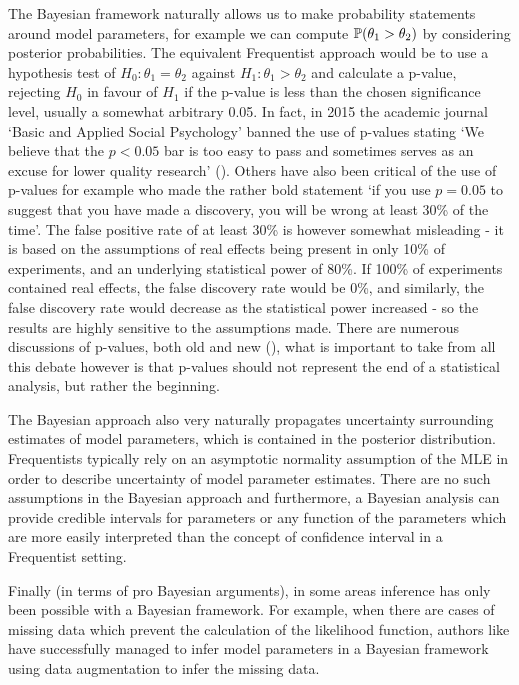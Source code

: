 The Bayesian framework naturally allows us to make probability statements around model parameters, for example we can
compute \(\mathbb{P}(\theta_1 > \theta_2)\) by considering posterior probabilities. The equivalent Frequentist approach would
be to use a hypothesis test of \(H_0: \theta_1 = \theta_2\) against \(H_1: \theta_1 > \theta_2\) and calculate a
p-value, rejecting \(H_0\) in favour of \(H_1\) if the p-value is less than the chosen significance level, usually a
somewhat arbitrary 0.05. In fact, in 2015 the academic journal `Basic and Applied Social Psychology' banned the use of
p-values stating `We believe that the \(p < 0.05\) bar is too easy to pass and sometimes serves as an excuse for lower
quality research' (\cite{pvalueban}). Others have also been critical of the use of p-values for example
\cite{colquhoun2014} who made the rather bold statement `if you use \(p = 0.05\) to suggest that you have made a
discovery, you will be wrong at least 30\% of the time'. The false positive rate of at least 30\% is however somewhat
misleading - it is based on the assumptions of real effects being present in only 10\% of experiments, and an underlying
statistical power of 80\%. If 100\% of experiments contained real effects, the false discovery rate would be 0\%, and
similarly, the false discovery rate would decrease as the statistical power increased - so the results are highly
sensitive to the assumptions made.
There are numerous discussions of p-values, both old and new (\cite{casella1987, ioannidis2005, Senn2015}), what is
important to take from all this debate however is that p-values should not represent the end of a statistical analysis,
but rather the beginning.

The Bayesian approach also very naturally propagates uncertainty surrounding estimates of model parameters, which is
contained in the posterior distribution. Frequentists typically rely on an asymptotic normality assumption of the
\gls{MLE} in order to describe uncertainty of model parameter estimates. There are no such assumptions in the Bayesian
approach and furthermore, a Bayesian analysis can provide credible intervals for parameters or any function of the
parameters which are more easily interpreted than the concept of confidence interval in a Frequentist setting.

Finally (in terms of pro Bayesian arguments), in some areas inference has only been possible with a Bayesian framework.
For example, when there are cases of missing data which prevent the calculation of the likelihood function, authors like
\cite{streftaris2004} have successfully managed to infer model parameters in a Bayesian framework using data
augmentation to infer the missing data.

